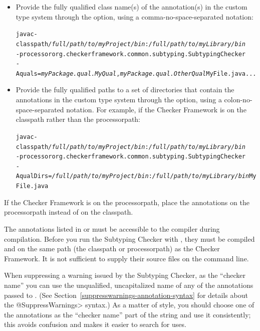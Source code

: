 \begin{itemize}

\item
Provide the fully qualified class name(s) of the annotation(s) in the custom
type system through the  option, using a comma-no-space-separated
notation:

\begin{alltt}
  javac -classpath \textit{/full/path/to/myProject/bin}:\textit{/full/path/to/myLibrary/bin} \ttbs
        -processor org.checkerframework.common.subtyping.SubtypingChecker \ttbs
        -Aquals=\textit{myPackage.qual.MyQual},\textit{myPackage.qual.OtherQual} MyFile.java ...
\end{alltt}

\item
Provide the fully qualified paths to a set of directories that contain the
annotations in the custom type system through the  option,
using a colon-no-space-separated notation. For example,
if the Checker Framework is on the classpath rather than the processorpath:

\begin{alltt}
  javac -classpath \textit{/full/path/to/myProject/bin}:\textit{/full/path/to/myLibrary/bin} \ttbs
        -processor org.checkerframework.common.subtyping.SubtypingChecker \ttbs
        -AqualDirs=\textit{/full/path/to/myProject/bin}:\textit{/full/path/to/myLibrary/bin} MyFile.java
\end{alltt}

\end{itemize}

If the Checker Framework is on the processorpath, place the annotations on
the processorpath instead of on the classpath.



The annotations listed in  or  must be accessible to
the compiler during compilation.  Before you run the Subtyping Checker with
, they must be compiled and on the same path (the classpath or
processorpath) as the Checker Framework.  It
is not sufficient to supply their source files on the command line.



When suppressing a warning issued by the Subtyping Checker, as the
``checker name'' you can use the unqualified, uncapitalized name of any of
the annotations passed to .  (See
Section~\ref{suppresswarnings-annotation-syntax} for details about the
\<@SuppressWarnings> syntax.)  As a matter of style, you should
choose one of the annotations as the ``checker name'' part of the
 string and use it consistently; this avoids
confusion and makes it easier to search for uses.


